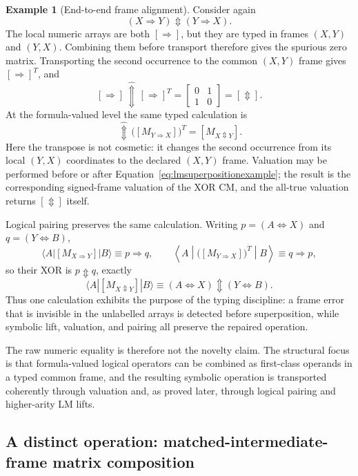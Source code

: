 \documentclass[11pt]{article}
\theoremstyle{definition}
\newtheorem{example}[theorem]{Example}
\theoremstyle{remark}
\newcommand{\xor}{\mathbin{\Updownarrow}}
\begin{document}
\begin{example}[End-to-end frame alignment]
Consider again
\[
 (X\Rightarrow Y)\xor(Y\Rightarrow X).
\]
The local numeric arrays are both $[\Rightarrow]$, but they are typed in frames $(X,Y)$ and $(Y,X)$.  Combining them before transport therefore gives the spurious zero matrix.  Transporting the second occurrence to the common $(X,Y)$ frame gives $[\Rightarrow]^T$, and
\[
 [\Rightarrow] \,\widehat{\Updownarrow}\, [\Rightarrow]^T
 =\begin{bmatrix}0&1\\1&0\end{bmatrix}
 =[\Updownarrow].
\]
At the formula-valued level the same typed calculation is
\begin{equation}
 [M_{X\Rightarrow Y}]\,\widehat{\Updownarrow}\,
 \bigl([M_{Y\Rightarrow X}]\bigr)^T
 =[M_{X\Updownarrow Y}].
 \label{eq:lmsuperpositionexample}
\end{equation}
Here the transpose is not cosmetic: it changes the second occurrence from its local $(Y,X)$ coordinates to the declared $(X,Y)$ frame.  Valuation may be performed before or after Equation~\eqref{eq:lmsuperpositionexample}; the result is the corresponding signed-frame valuation of the XOR CM, and the all-true valuation returns $[\Updownarrow]$ itself.

Logical pairing preserves the same calculation.  Writing
$p=(A\Leftrightarrow X)$ and $q=(Y\Leftrightarrow B)$,
\[
 \langle A|[M_{X\Rightarrow Y}]|B\rangle\equiv p\Rightarrow q,
 \qquad
 \left\langle A\middle|\bigl([M_{Y\Rightarrow X}]\bigr)^T\middle|B\right\rangle\equiv q\Rightarrow p,
\]
so their XOR is $p\xor q$, exactly
\[
 \langle A|[M_{X\Updownarrow Y}]|B\rangle
 \equiv (A\Leftrightarrow X)\xor(Y\Leftrightarrow B).
\]
Thus one calculation exhibits the purpose of the typing discipline: a frame error that is invisible in the unlabelled arrays is detected before superposition, while symbolic lift, valuation, and pairing all preserve the repaired operation.
\end{example}

The raw numeric equality is therefore not the novelty claim.  The structural focus is that formula-valued logical operators can be combined as first-class operands in a typed common frame, and the resulting symbolic operation is transported coherently through valuation and, as proved later, through logical pairing and higher-arity LM lifts.

\subsection{A distinct operation: matched-intermediate-frame matrix composition}
\end{document}
